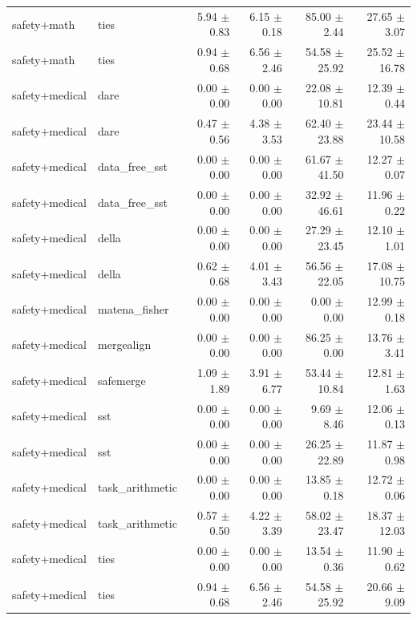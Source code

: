 \begin{table}[H]
{\begin{tabular}{llrrrr}
safety+math & ties & 5.94 $\pm$ 0.83 & 6.15 $\pm$ 0.18 & 85.00 $\pm$ 2.44 & 27.65 $\pm$ 3.07 \\
safety+math & ties & 0.94 $\pm$ 0.68 & 6.56 $\pm$ 2.46 & 54.58 $\pm$ 25.92 & 25.52 $\pm$ 16.78 \\
safety+medical & dare & 0.00 $\pm$ 0.00 & 0.00 $\pm$ 0.00 & 22.08 $\pm$ 10.81 & 12.39 $\pm$ 0.44 \\
safety+medical & dare & 0.47 $\pm$ 0.56 & 4.38 $\pm$ 3.53 & 62.40 $\pm$ 23.88 & 23.44 $\pm$ 10.58 \\
safety+medical & data\_free\_sst & 0.00 $\pm$ 0.00 & 0.00 $\pm$ 0.00 & 61.67 $\pm$ 41.50 & 12.27 $\pm$ 0.07 \\
safety+medical & data\_free\_sst & 0.00 $\pm$ 0.00 & 0.00 $\pm$ 0.00 & 32.92 $\pm$ 46.61 & 11.96 $\pm$ 0.22 \\
safety+medical & della & 0.00 $\pm$ 0.00 & 0.00 $\pm$ 0.00 & 27.29 $\pm$ 23.45 & 12.10 $\pm$ 1.01 \\
safety+medical & della & 0.62 $\pm$ 0.68 & 4.01 $\pm$ 3.43 & 56.56 $\pm$ 22.05 & 17.08 $\pm$ 10.75 \\
safety+medical & matena\_fisher & 0.00 $\pm$ 0.00 & 0.00 $\pm$ 0.00 & 0.00 $\pm$ 0.00 & 12.99 $\pm$ 0.18 \\
safety+medical & mergealign & 0.00 $\pm$ 0.00 & 0.00 $\pm$ 0.00 & 86.25 $\pm$ 0.00 & 13.76 $\pm$ 3.41 \\
safety+medical & safemerge & 1.09 $\pm$ 1.89 & 3.91 $\pm$ 6.77 & 53.44 $\pm$ 10.84 & 12.81 $\pm$ 1.63 \\
safety+medical & sst & 0.00 $\pm$ 0.00 & 0.00 $\pm$ 0.00 & 9.69 $\pm$ 8.46 & 12.06 $\pm$ 0.13 \\
safety+medical & sst & 0.00 $\pm$ 0.00 & 0.00 $\pm$ 0.00 & 26.25 $\pm$ 22.89 & 11.87 $\pm$ 0.98 \\
safety+medical & task\_arithmetic & 0.00 $\pm$ 0.00 & 0.00 $\pm$ 0.00 & 13.85 $\pm$ 0.18 & 12.72 $\pm$ 0.06 \\
safety+medical & task\_arithmetic & 0.57 $\pm$ 0.50 & 4.22 $\pm$ 3.39 & 58.02 $\pm$ 23.47 & 18.37 $\pm$ 12.03 \\
safety+medical & ties & 0.00 $\pm$ 0.00 & 0.00 $\pm$ 0.00 & 13.54 $\pm$ 0.36 & 11.90 $\pm$ 0.62 \\
safety+medical & ties & 0.94 $\pm$ 0.68 & 6.56 $\pm$ 2.46 & 54.58 $\pm$ 25.92 & 20.66 $\pm$ 9.09 \\
\bottomrule
\end{tabular}
}
\end{table}